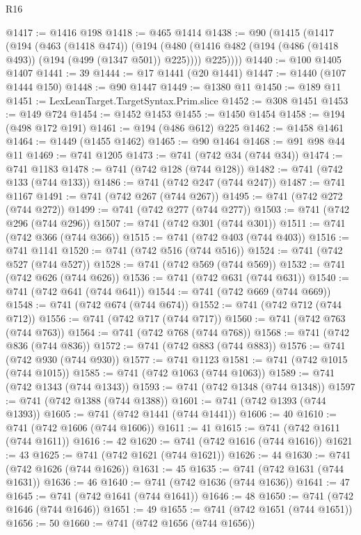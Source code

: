 \begin{lexlean}{R16}
\begin{coremodule}
@1417 := @1416 @198
@1418 := @465 @1414
@1438 := @90
    (@1415
      (@1417
        (@194
          (@463 (@1418 @474))
          (@194
            (@480 (@1416 @482 (@194 (@486 (@1418 @493)) (@194 (@499 (@1347 @501)) @225))))
            @225))))
@1440 := @100 @1405 @1407
@1441 := 39
@1444 := @17 @1441 (@20 @1441)
@1447 := @1440 (@107 @1444 @150)
@1448 := @90 @1447
@1449 := @1380 @11
@1450 := @189 @11
@1451 := LexLeanTarget.TargetSyntax.Prim.slice
@1452 := @308 @1451
@1453 := @149 @724
@1454 := @1452 @1453
@1455 := @1450 @1454
@1458 := @194 (@498 @172 @191)
@1461 := @194 (@486 @612) @225
@1462 := @1458 @1461
@1464 := @1449 (@1455 @1462)
@1465 := @90 @1464
@1468 := @91 @98 @44 @11
@1469 := @741 @1205
@1473 := @741 (@742 @34 (@744 @34))
@1474 := @741 @1183
@1478 := @741 (@742 @128 (@744 @128))
@1482 := @741 (@742 @133 (@744 @133))
@1486 := @741 (@742 @247 (@744 @247))
@1487 := @741 @1167
@1491 := @741 (@742 @267 (@744 @267))
@1495 := @741 (@742 @272 (@744 @272))
@1499 := @741 (@742 @277 (@744 @277))
@1503 := @741 (@742 @296 (@744 @296))
@1507 := @741 (@742 @301 (@744 @301))
@1511 := @741 (@742 @366 (@744 @366))
@1515 := @741 (@742 @403 (@744 @403))
@1516 := @741 @1141
@1520 := @741 (@742 @516 (@744 @516))
@1524 := @741 (@742 @527 (@744 @527))
@1528 := @741 (@742 @569 (@744 @569))
@1532 := @741 (@742 @626 (@744 @626))
@1536 := @741 (@742 @631 (@744 @631))
@1540 := @741 (@742 @641 (@744 @641))
@1544 := @741 (@742 @669 (@744 @669))
@1548 := @741 (@742 @674 (@744 @674))
@1552 := @741 (@742 @712 (@744 @712))
@1556 := @741 (@742 @717 (@744 @717))
@1560 := @741 (@742 @763 (@744 @763))
@1564 := @741 (@742 @768 (@744 @768))
@1568 := @741 (@742 @836 (@744 @836))
@1572 := @741 (@742 @883 (@744 @883))
@1576 := @741 (@742 @930 (@744 @930))
@1577 := @741 @1123
@1581 := @741 (@742 @1015 (@744 @1015))
@1585 := @741 (@742 @1063 (@744 @1063))
@1589 := @741 (@742 @1343 (@744 @1343))
@1593 := @741 (@742 @1348 (@744 @1348))
@1597 := @741 (@742 @1388 (@744 @1388))
@1601 := @741 (@742 @1393 (@744 @1393))
@1605 := @741 (@742 @1441 (@744 @1441))
@1606 := 40
@1610 := @741 (@742 @1606 (@744 @1606))
@1611 := 41
@1615 := @741 (@742 @1611 (@744 @1611))
@1616 := 42
@1620 := @741 (@742 @1616 (@744 @1616))
@1621 := 43
@1625 := @741 (@742 @1621 (@744 @1621))
@1626 := 44
@1630 := @741 (@742 @1626 (@744 @1626))
@1631 := 45
@1635 := @741 (@742 @1631 (@744 @1631))
@1636 := 46
@1640 := @741 (@742 @1636 (@744 @1636))
@1641 := 47
@1645 := @741 (@742 @1641 (@744 @1641))
@1646 := 48
@1650 := @741 (@742 @1646 (@744 @1646))
@1651 := 49
@1655 := @741 (@742 @1651 (@744 @1651))
@1656 := 50
@1660 := @741 (@742 @1656 (@744 @1656))

\end{coremodule}
\end{lexlean}
